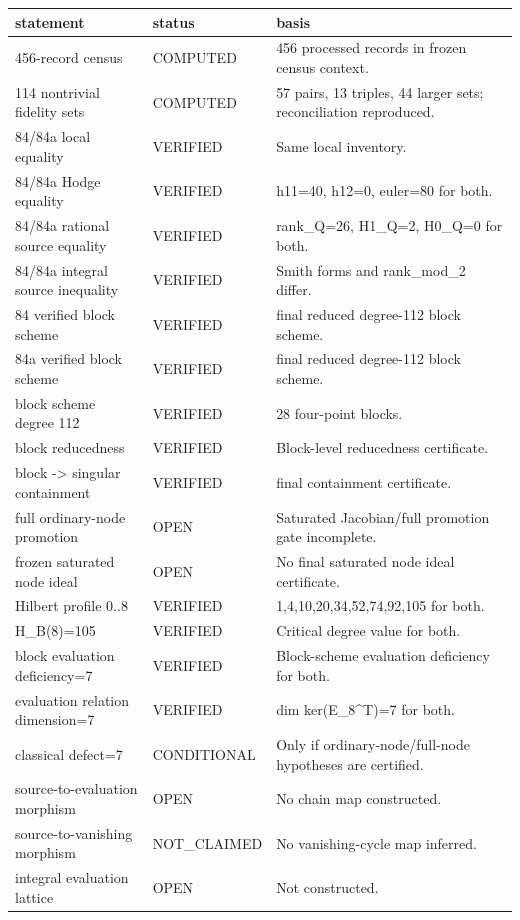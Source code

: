 \begin{tabular}{lll}
\hline
statement & status & basis \\
\hline
456-record census & COMPUTED & 456 processed records in frozen census context. \\
114 nontrivial fidelity sets & COMPUTED & 57 pairs, 13 triples, 44 larger sets; reconciliation reproduced. \\
84/84a local equality & VERIFIED & Same local inventory. \\
84/84a Hodge equality & VERIFIED & h11=40, h12=0, euler=80 for both. \\
84/84a rational source equality & VERIFIED & rank\_Q=26, H1\_Q=2, H0\_Q=0 for both. \\
84/84a integral source inequality & VERIFIED & Smith forms and rank\_mod\_2 differ. \\
84 verified block scheme & VERIFIED & final reduced degree-112 block scheme. \\
84a verified block scheme & VERIFIED & final reduced degree-112 block scheme. \\
block scheme degree 112 & VERIFIED & 28 four-point blocks. \\
block reducedness & VERIFIED & Block-level reducedness certificate. \\
block -> singular containment & VERIFIED & final containment certificate. \\
full ordinary-node promotion & OPEN & Saturated Jacobian/full promotion gate incomplete. \\
frozen saturated node ideal & OPEN & No final saturated node ideal certificate. \\
Hilbert profile 0..8 & VERIFIED & 1,4,10,20,34,52,74,92,105 for both. \\
H\_B(8)=105 & VERIFIED & Critical degree value for both. \\
block evaluation deficiency=7 & VERIFIED & Block-scheme evaluation deficiency for both. \\
evaluation relation dimension=7 & VERIFIED & dim ker(E\_8^T)=7 for both. \\
classical defect=7 & CONDITIONAL & Only if ordinary-node/full-node hypotheses are certified. \\
source-to-evaluation morphism & OPEN & No chain map constructed. \\
source-to-vanishing morphism & NOT\_CLAIMED & No vanishing-cycle map inferred. \\
integral evaluation lattice & OPEN & Not constructed. \\

\end{tabular}
